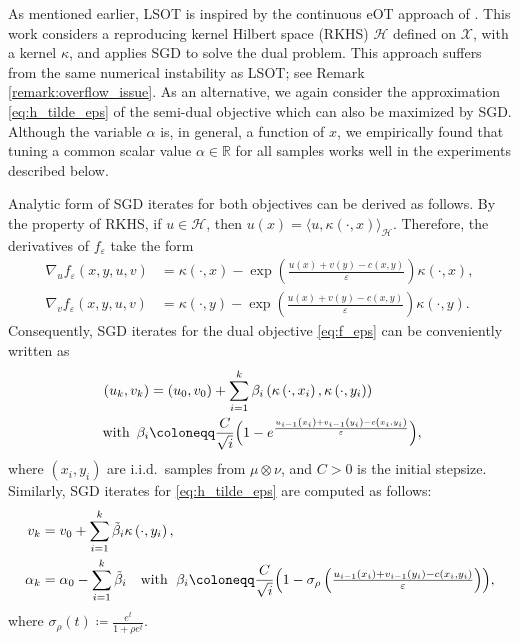 \documentclass{article}
\newcommand{\R}{\mathbb{R}}
\newcommand*{\eqset}{\coloneqq}
\def\cX{\mathcal{X}}
\def\cH{\mathcal{H}}
\theoremstyle{plain}
\theoremstyle{definition}
\theoremstyle{remark}
\begin{document}
As mentioned earlier, LSOT \citep{seguy2018large} is inspired by the continuous eOT approach of \citet{genevay2016stochastic}. This work considers a reproducing kernel Hilbert space (RKHS) \(\cH\) defined on $\cX$, with a kernel $\kappa$, and applies SGD to solve the dual problem. This approach suffers from the same numerical instability as LSOT; see Remark \ref{remark:overflow_issue}. As an alternative, we again consider the approximation \eqref{eq:h_tilde_eps} of the semi-dual objective which can also be maximized by SGD. Although the variable $\alpha$ is, in general, a function of $x$, we empirically found that tuning a common scalar value $\alpha \in \R$ for all samples works well in the experiments described below.

Analytic form of SGD iterates for both objectives can be derived as follows. 
By the property of RKHS, if $u \in \cH$, then $u(x) = \langle u, \kappa(\cdot, x)\rangle_{\cH}$. Therefore, the derivatives of $f_{\varepsilon}$ take the form
\begin{align*}
    \nabla_u f_{\varepsilon}(x, y, u, v) &= \kappa(\cdot, x) - \exp \left(\frac{u(x)+v(y)-c(x, y)}{\varepsilon}\right) \kappa(\cdot, x), \\
    \nabla_v f_{\varepsilon}(x, y, u, v) &= \kappa(\cdot, y) - \exp \left(\frac{u(x)+v(y)-c(x, y)}{\varepsilon}\right) \kappa(\cdot, y).
\end{align*}
Consequently, SGD iterates for the dual objective \eqref{eq:f_eps} can be conveniently written as
\begin{align}
    \label{eq:kernlsgd}
    \left(u_k, v_k\right) &= \left(u_0, v_0\right) + \sum_{i=1}^k \beta_i\left(\kappa\left(\cdot, x_i\right), \kappa\left(\cdot, y_i\right)\right) \\
    \label{eq:stepsize}
    \text { with }\, \beta_i &\eqset \frac{C}{\sqrt{i}}\Bigl(1-e^{\frac{u_{i-1}\left(x_i\right)+v_{i-1}\left(y_i\right)-c\left(x_i, y_i\right)}{\varepsilon}}\Bigr),
\end{align}
where \((x_i, y_i)\) are i.i.d.\ samples from \( \mu \otimes \nu \), and
\( C>0 \) is the initial stepsize.
Similarly, SGD iterates for \eqref{eq:h_tilde_eps} are computed as follows:
\begin{align*}
    v_k &= v_0 + \sum_{i=1}^k \tilde{\beta}_i \kappa\left(\cdot, y_i\right), \\
    \alpha_k &= \alpha_0 - \sum_{i=1}^k \tilde{\beta}_i \quad
    \text {with }\; \beta_i \eqset \frac{C}{\sqrt{i}}\Bigl(1-\sigma_\rho \left(\textstyle \frac{u_{i-1}\left(x_i\right)+v_{i-1}\left(y_i\right)-c\left(x_i, y_i\right)}{\varepsilon}\right) \Bigr),
\end{align*}
where $\sigma_{\rho}(t) \eqset \frac{e^t}{1 + \rho e^t}$.
\end{document}
